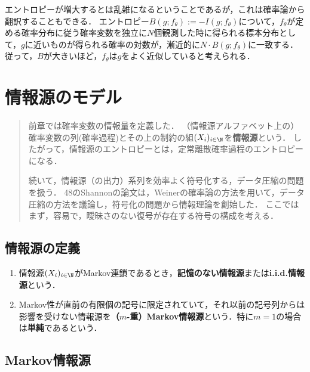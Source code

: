 \documentclass[uplatex,dvipdfmx]{jsreport}
\begin{document}
\begin{remarks}[Boltzmanのエントロピーの確率論的解釈]
    エントロピーが増大するとは乱雑になるということであるが，これは確率論から翻訳することもできる．
    エントロピー$B(g;f_\theta):=-I(g;f_\theta)$について，$f_\theta$が定める確率分布に従う確率変数を独立に$N$個観測した時に得られる標本分布として，$g$に近いものが得られる確率の対数が，漸近的に$N\cdot B(g;f_\theta)$に一致する\cite{Sanov61}．
    従って，$B$が大きいほど，$f_\theta$は$g$をよく近似していると考えられる．
\end{remarks}

\chapter{情報源のモデル}

\begin{quotation}
    前章では確率変数の情報量を定義した．
    （情報源アルファベット上の）確率変数の列(確率過程)とその上の制約の組$(X_i)_{i\in\N}$を\textbf{情報源}という．
    したがって，情報源のエントロピーとは，定常離散確率過程のエントロピーになる．

    続いて，情報源（の出力）系列を効率よく符号化する，データ圧縮の問題を扱う．
    48のShannonの論文は，Weinerの確率論の方法を用いて，データ圧縮の方法を議論し，符号化の問題から情報理論を創始した．
    ここではまず，容易で，曖昧さのない復号が存在する符号の構成を考える．
\end{quotation}

\section{情報源の定義}

\begin{definition}\mbox{}
    \begin{enumerate}
        \item 情報源$(X_i)_{i\in\N}$がMarkov連鎖であるとき，\textbf{記憶のない情報源}または\textbf{i.i.d.情報源}という．
        \item Markov性が直前の有限個の記号に限定されていて，それ以前の記号列からは影響を受けない情報源を\textbf{（$m$-重）Markov情報源}という．特に$m=1$の場合は\textbf{単純}であるという．
    \end{enumerate}
\end{definition}

\section{Markov情報源}
\end{document}
